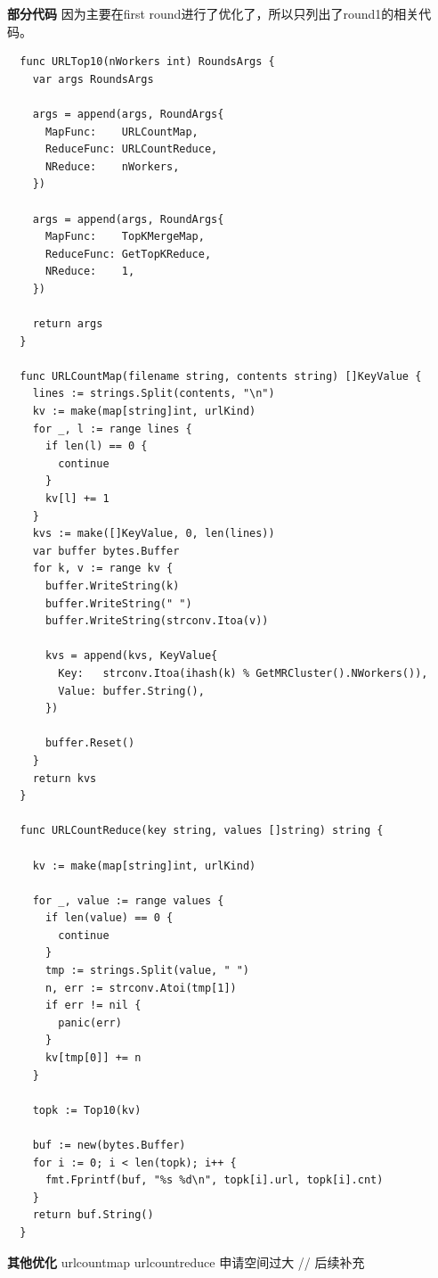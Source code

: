 \documentclass[UTF8]{ctexart}
\begin{document}
\textbf{部分代码}
因为主要在first round进行了优化了，所以只列出了round1的相关代码。
\begin{lstlisting}
  func URLTop10(nWorkers int) RoundsArgs {
    var args RoundsArgs
  
    args = append(args, RoundArgs{
      MapFunc:    URLCountMap,
      ReduceFunc: URLCountReduce,
      NReduce:    nWorkers,
    })
  
    args = append(args, RoundArgs{
      MapFunc:    TopKMergeMap,
      ReduceFunc: GetTopKReduce,
      NReduce:    1,
    })
  
    return args
  }
  
  func URLCountMap(filename string, contents string) []KeyValue {
    lines := strings.Split(contents, "\n")
    kv := make(map[string]int, urlKind)
    for _, l := range lines {
      if len(l) == 0 {
        continue
      }
      kv[l] += 1
    }
    kvs := make([]KeyValue, 0, len(lines))
    var buffer bytes.Buffer
    for k, v := range kv {
      buffer.WriteString(k)
      buffer.WriteString(" ")
      buffer.WriteString(strconv.Itoa(v))
  
      kvs = append(kvs, KeyValue{
        Key:   strconv.Itoa(ihash(k) % GetMRCluster().NWorkers()),
        Value: buffer.String(),
      })
  
      buffer.Reset()
    }
    return kvs
  }
  
  func URLCountReduce(key string, values []string) string {
  
    kv := make(map[string]int, urlKind)
  
    for _, value := range values {
      if len(value) == 0 {
        continue
      }
      tmp := strings.Split(value, " ")
      n, err := strconv.Atoi(tmp[1])
      if err != nil {
        panic(err)
      }
      kv[tmp[0]] += n
    }
  
    topk := Top10(kv)
  
    buf := new(bytes.Buffer)
    for i := 0; i < len(topk); i++ {
      fmt.Fprintf(buf, "%s %d\n", topk[i].url, topk[i].cnt)
    }
    return buf.String()
  }  
\end{lstlisting}

\textbf{其他优化}
urlcountmap urlcountreduce 申请空间过大
// 后续补充
\end{document}

